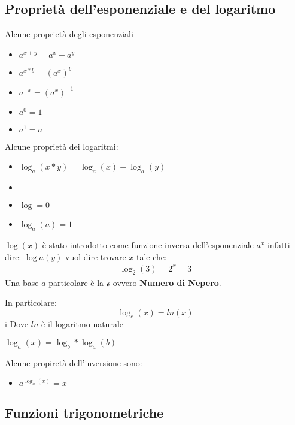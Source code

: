 \documentclass[../main.tex, class=article, 12pt]{subfiles}
\begin{document}
\subsection{Proprietà dell'esponenziale e del logaritmo}

Alcune proprietà degli esponenziali
\begin{itemize}
        \item $a^{x+y} = a^x + a^y$
        \item $a^{x*b} = (a^x)^b$
        \item $a^{-x} = (a^x)^{-1}$
        \item $a^0 = 1$
        \item $a^1 = a$
\end{itemize}

Alcune proprietà dei logaritmi: 
\begin{itemize}
        \item $\log_a(x*y) = \log_a(x) + \log_a(y)$
        \item $  $
        \item $\log = 0$
        \item $\log_a(a) = 1$
\end{itemize}

$ \log(x) $ è stato introdotto come funzione inversa dell'esponenziale $ a^x $ infatti dire: $ \log a(y) $ vuol dire trovare $ x $ tale
che:
\begin{align*}
       \log_2 (3) = 2^x = 3 
\end{align*}
Una base $ a $ particolare è la $ \mathcal{e} $ ovvero \textbf{Numero di Nepero}.

In particolare:
\begin{equation*}
        \log_e(x) = ln(x)
\end{equation*}i
Dove $ ln $ è il \underline{logaritmo naturale}



$ \log_a(x) = \log_b * \log_a(b)$ 

Alcune propiretà dell'inversione sono:
\begin{itemize}
        \item $a^{\log_a(x)} = x$
\end{itemize}



\subsection{Funzioni trigonometriche}
\end{document}

